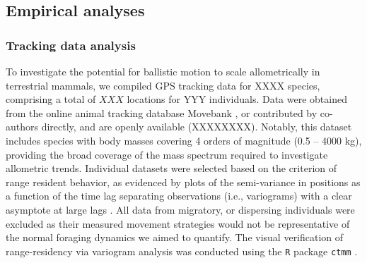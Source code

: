 \documentclass[12pt]{article}
\begin{document}
\subsection*{Empirical analyses}

\subsubsection*{Tracking data analysis}

To investigate the potential for ballistic motion to scale allometrically in terrestrial mammals, we compiled GPS tracking data for XXXX species, comprising a total of $XXX$ locations for YYY individuals. Data were obtained from the online animal tracking database Movebank \cite{Wikelski:2017uy}, or contributed by co-authors directly, and are openly available (XXXXXXXX). Notably, this dataset includes species with body masses covering 4 orders of magnitude (0.5 -- 4000 kg), providing the broad coverage of the mass spectrum required to investigate allometric trends. Individual datasets were selected based on the criterion of range resident behavior, as evidenced by plots of the semi-variance in positions as a function of the time lag separating observations (i.e., variograms) with a clear asymptote at large lags \cite{Fleming:2014jr, Calabrese:2016ey}. All data from migratory, or dispersing individuals were excluded as their measured movement strategies would not be representative of the normal foraging dynamics we aimed to quantify. The visual verification of range-residency via variogram analysis \cite{Fleming:2014jr} was conducted using the \texttt{R} package \texttt{ctmm} \cite{Calabrese:2016ey}.
\end{document}
